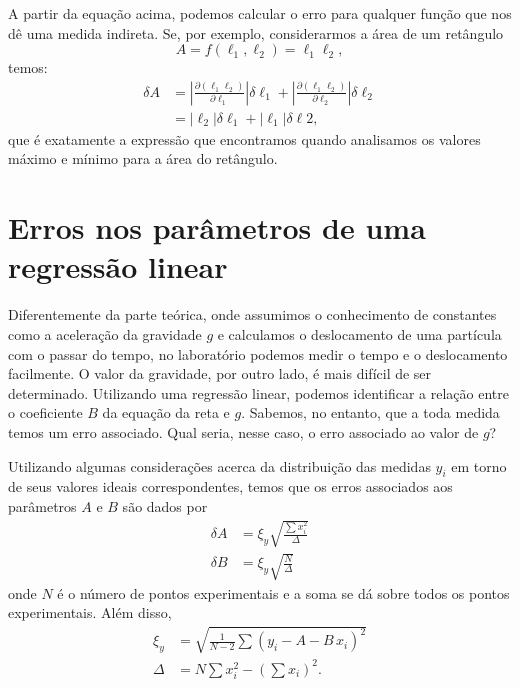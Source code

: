 A partir da equação acima, podemos calcular o erro para qualquer função que nos dê uma medida indireta. Se, por exemplo, considerarmos a área de um retângulo
\begin{equation}
    A = f(\ell_1,\ell_2)=\ell_1\ell_2,
\end{equation}
%
temos:
\begin{align}
	\delta A &= \left|\frac{\partial(\ell_1\ell_2)}{\partial \ell_1}\right|\delta \ell_1 + \left|\frac{\partial (\ell_1\ell_2)}{\partial \ell_2}\right|\delta \ell_2 \\
	&= |\ell_2|\delta \ell_1 + |\ell_1|\delta \ell2,
\end{align}
%
que é exatamente a expressão que encontramos quando analisamos os valores máximo e mínimo para a área do retângulo. 

\section{Erros nos parâmetros de uma regressão linear}
\label{Chap:ErrosCoefAB}

Diferentemente da parte teórica, onde assumimos o conhecimento de constantes como a aceleração da gravidade $g$ e calculamos o deslocamento de uma partícula com o passar do tempo, no laboratório podemos medir o tempo e o deslocamento facilmente. O valor da gravidade, por outro lado, é mais difícil de ser determinado. Utilizando uma regressão linear, podemos identificar a relação entre o coeficiente $B$ da equação da reta e $g$. Sabemos, no entanto, que a toda medida temos um erro associado. Qual seria, nesse caso, o erro associado ao valor de $g$? 

Utilizando algumas considerações\cite{Taylor} acerca da distribuição das medidas $y_i$ em torno de seus valores ideais correspondentes, temos que os erros associados aos parâmetros $A$ e $B$ são dados por
\begin{align}
	\delta A &= \xi_y\sqrt{\frac{\sum x_i^2}{\Delta}} \label{Eq:ErrosCoeficientesRegLinear1}\\
	\delta B &= \xi_y\sqrt{\frac{N}{\Delta}}
\end{align}
%
onde $N$ é o número de pontos experimentais e a soma se dá sobre todos os pontos experimentais. Além disso,
\begin{align}
	\xi_y &= \sqrt{\frac{1}{N-2}\sum(y_i-A-B\,x_i)^2} \\
	\Delta &= N\sum x_i^2 - \left(\sum x_i\right)^2. \label{Eq:ErrosCoeficientesRegLinear4}
\end{align}


